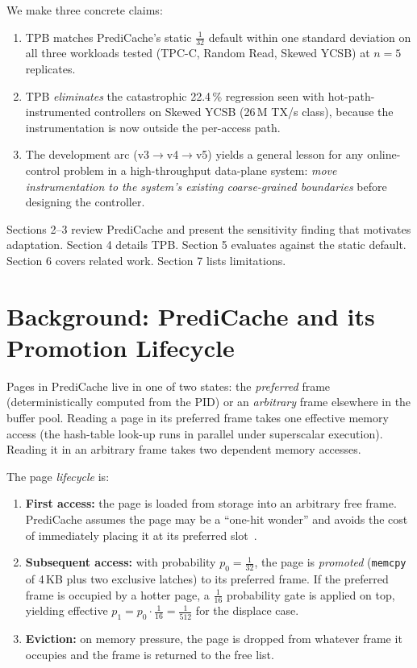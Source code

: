 \documentclass[10pt,twocolumn]{article}
\begin{document}
We make three concrete claims:

\begin{enumerate}\itemsep0pt
\item TPB matches PrediCache's static $\tfrac{1}{32}$ default within
      one standard deviation on all three workloads tested (TPC-C,
      Random Read, Skewed YCSB) at $n\!=\!5$ replicates.
\item TPB \emph{eliminates} the catastrophic 22.4\,\% regression seen
      with hot-path-instrumented controllers on Skewed YCSB
      (26\,M TX/s class), because the instrumentation is now outside
      the per-access path.
\item The development arc (v3$\to$v4$\to$v5) yields a general lesson
      for any online-control problem in a high-throughput data-plane
      system: \emph{move instrumentation to the system's existing
      coarse-grained boundaries} before designing the controller.
\end{enumerate}

Sections 2--3 review PrediCache and present the sensitivity finding that
motivates adaptation.  Section 4 details TPB.  Section 5 evaluates against
the static default.  Section 6 covers related work.  Section 7 lists
limitations.

\section{Background: PrediCache and its Promotion Lifecycle}

Pages in PrediCache live in one of two states: the \emph{preferred} frame
(deterministically computed from the PID) or an \emph{arbitrary} frame
elsewhere in the buffer pool.  Reading a page in its preferred frame
takes one effective memory access (the hash-table look-up runs in parallel
under superscalar execution).  Reading it in an arbitrary frame takes
two dependent memory accesses.

The page \emph{lifecycle} is:

\begin{enumerate}\itemsep0pt
\item \textbf{First access:} the page is loaded from storage into an
      arbitrary free frame.  PrediCache assumes the page may be a
      ``one-hit wonder'' and avoids the cost of immediately placing it
      at its preferred slot~\cite{zinsmeister2026predictive}.
\item \textbf{Subsequent access:} with probability $p_0\!=\!\tfrac{1}{32}$,
      the page is \emph{promoted} (\texttt{memcpy} of 4\,KB plus two
      exclusive latches) to its preferred frame.  If the preferred
      frame is occupied by a hotter page, a $\tfrac{1}{16}$ probability
      gate is applied on top, yielding effective
      $p_1 = p_0 \cdot \tfrac{1}{16} = \tfrac{1}{512}$ for the displace
      case.
\item \textbf{Eviction:} on memory pressure, the page is dropped from
      whatever frame it occupies and the frame is returned to the free
      list.
\end{enumerate}
\end{document}
